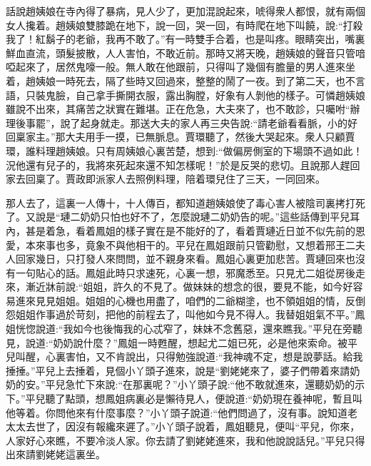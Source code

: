 


\begin{parag}
    話說趙姨娘在寺內得了暴病，見人少了，更加混說起來，唬得衆人都恨，就有兩個女人攙着。趙姨娘雙膝跪在地下，說一回，哭一回，有時爬在地下叫饒，說:“打殺我了！紅鬍子的老爺，我再不敢了。”有一時雙手合着，也是叫疼。眼睛突出，嘴裏鮮血直流，頭髮披散，人人害怕，不敢近前。那時又將天晚，趙姨娘的聲音只管喑啞起來了，居然鬼嚎一般。無人敢在他跟前，只得叫了幾個有膽量的男人進來坐着，趙姨娘一時死去，隔了些時又回過來，整整的鬧了一夜。到了第二天，也不言語，只裝鬼臉，自己拿手撕開衣服，露出胸膛，好象有人剝他的樣子。可憐趙姨娘雖說不出來，其痛苦之狀實在難堪。正在危急，大夫來了，也不敢診，只囑咐“辦理後事罷”，說了起身就走。那送大夫的家人再三央告說:“請老爺看看脈，小的好回稟家主。”那大夫用手一摸，已無脈息。賈環聽了，然後大哭起來。衆人只顧賈環，誰料理趙姨娘。只有周姨娘心裏苦楚，想到:“做偏房側室的下場頭不過如此！況他還有兒子的，我將來死起來還不知怎樣呢！”於是反哭的悲切。且說那人趕回家去回稟了。賈政即派家人去照例料理，陪着環兒住了三天，一同回來。
\end{parag}


\begin{parag}
    那人去了，這裏一人傳十，十人傳百，都知道趙姨娘使了毒心害人被陰司裏拷打死了。又說是“璉二奶奶只怕也好不了，怎麼說璉二奶奶告的呢。”這些話傳到平兒耳內，甚是着急，看着鳳姐的樣子實在是不能好的了，看着賈璉近日並不似先前的恩愛，本來事也多，竟象不與他相干的。平兒在鳳姐跟前只管勸慰，又想着邢王二夫人回家幾日，只打發人來問問，並不親身來看。鳳姐心裏更加悲苦。賈璉回來也沒有一句貼心的話。鳳姐此時只求速死，心裏一想，邪魔悉至。只見尤二姐從房後走來，漸近牀前說:“姐姐，許久的不見了。做妹妹的想念的很，要見不能，如今好容易進來見見姐姐。姐姐的心機也用盡了，咱們的二爺糊塗，也不領姐姐的情，反倒怨姐姐作事過於苛刻，把他的前程去了，叫他如今見不得人。我替姐姐氣不平。”鳳姐恍惚說道:“我如今也後悔我的心忒窄了，妹妹不念舊惡，還來瞧我。”平兒在旁聽見，說道:“奶奶說什麼？”鳳姐一時甦醒，想起尤二姐已死，必是他來索命。被平兒叫醒，心裏害怕，又不肯說出，只得勉強說道:“我神魂不定，想是說夢話。給我捶捶。”平兒上去捶着，見個小丫頭子進來，說是“劉姥姥來了，婆子們帶着來請奶奶的安。”平兒急忙下來說:“在那裏呢？”小丫頭子說:“他不敢就進來，還聽奶奶的示下。”平兒聽了點頭，想鳳姐病裏必是懶待見人，便說道:“奶奶現在養神呢，暫且叫他等着。你問他來有什麼事麼？”小丫頭子說道:“他們問過了，沒有事。說知道老太太去世了，因沒有報纔來遲了。”小丫頭子說着，鳳姐聽見，便叫“平兒，你來，人家好心來瞧，不要冷淡人家。你去請了劉姥姥進來，我和他說說話兒。”平兒只得出來請劉姥姥這裏坐。
\end{parag}


